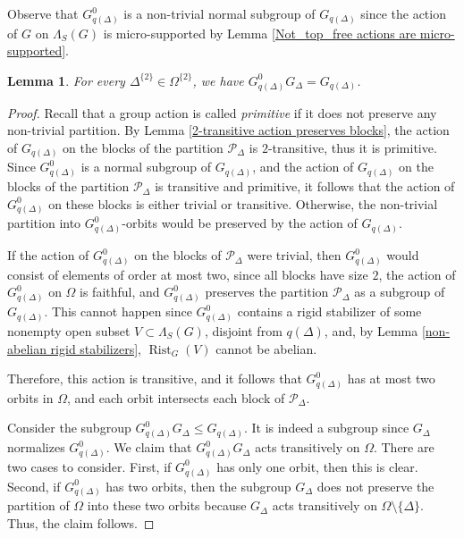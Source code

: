 \documentclass[11pt,letterpaper]{article}
\DeclareMathOperator{\rist}{Rist}
\newtheorem{lem}[thm]{Lemma}
\theoremstyle{definition}
\theoremstyle{remark}
\begin{document}
 Observe that $G_{q(\Delta)}^0$ is a non-trivial normal subgroup of $G_{q(\Delta)}$ since the action of $G$ on $\Lambda_S(G)$ is micro-supported by Lemma \ref{Not_top_free actions are micro-supported}.
\begin{lem}\label{product coinsides with the stabilizer}
    For every $\Delta^{\{2\}} \in \Omega^{\{2\}}$, we have $G_{q(\Delta)}^0G_\Delta=G_{q(\Delta)}$.
\end{lem}
\begin{proof}
   Recall that a group action is called {\it primitive} if it does not preserve any non-trivial partition. By Lemma \ref{2-transitive action preserves blocks}, the action of $G_{q(\Delta)}$ on the blocks of the partition $\mathcal{P}_{\Delta}$ is $2$-transitive, thus it is primitive. Since $G_{q(\Delta)}^0$ is a normal subgroup of $G_{q(\Delta)}$, and the action of $G_{q(\Delta)}$ on the blocks of the partition $\mathcal{P}_{\Delta}$ is transitive and primitive, it follows that the action of $G_{q(\Delta)}^0$ on these blocks is either trivial or transitive. Otherwise, the non-trivial partition into $G_{q(\Delta)}^0$-orbits would be preserved by the action of $G_{q(\Delta)}$.
    
   If the action of $G_{q(\Delta)}^0$ on the blocks of $\mathcal{P}_{\Delta}$ were trivial, then $G_{q(\Delta)}^0$ would consist of elements of order at most two, since all blocks have size $2$, the action of $G_{q(\Delta)}^0$ on $\Omega$ is faithful, and $G_{q(\Delta)}^0$ preserves the partition $\mathcal{P}_{\Delta}$ as a subgroup of $G_{q(\Delta)}$. This cannot happen since $G_{q(\Delta)}^0$ contains a rigid stabilizer of some nonempty open subset $V \subset \Lambda_S(G)$, disjoint from $q(\Delta)$, and, by Lemma \ref{non-abelian rigid stabilizers}, $\rist_G(V)$ cannot be abelian. 
   
   Therefore, this action is transitive, and it follows that $G_{q(\Delta)}^0$ has at most two orbits in $\Omega$, and each orbit intersects each block of $\mathcal{P}_{\Delta}$.
   
   Consider the subgroup $G_{q(\Delta)}^0G_\Delta \leq G_{q(\Delta)}$.
   It is indeed a subgroup since $G_{\Delta}$ normalizes $G_{q(\Delta)}^0$. We claim that $G_{q(\Delta)}^0G_\Delta$ acts transitively on $\Omega$. There are two cases to consider. First, if $G_{q(\Delta)}^0$ has only one orbit, then this is clear. Second, if $G_{q(\Delta)}^0$ has two orbits, then the subgroup $G_\Delta$ does not preserve the partition of $\Omega$ into these two orbits because $G_\Delta$ acts transitively on $\Omega \setminus \{\Delta\}$. Thus, the claim follows. 


\end{proof}
\end{document}
